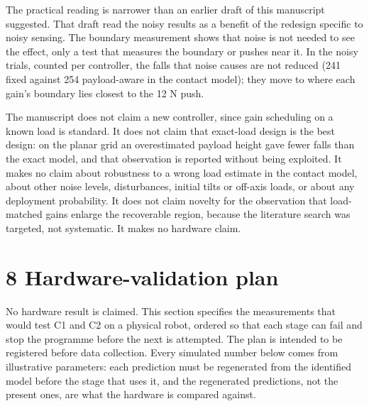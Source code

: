 \documentclass[11pt,a4paper]{article}
\begin{document}
The practical reading is narrower than an earlier draft of this manuscript suggested. That draft read the noisy results as a benefit of the redesign specific to noisy sensing. The boundary measurement shows that noise is not needed to see the effect, only a test that measures the boundary or pushes near it. In the noisy trials, counted per controller, the falls that noise causes are not reduced (241 fixed against 254 payload-aware in the contact model); they move to where each gain's boundary lies closest to the 12 N push.

The manuscript does not claim a new controller, since gain scheduling on a known load is standard. It does not claim that exact-load design is the best design: on the planar grid an overestimated payload height gave fewer falls than the exact model, and that observation is reported without being exploited. It makes no claim about robustness to a wrong load estimate in the contact model, about other noise levels, disturbances, initial tilts or off-axis loads, or about any deployment probability. It does not claim novelty for the observation that load-matched gains enlarge the recoverable region, because the literature search was targeted, not systematic. It makes no hardware claim.

\section*{8 Hardware-validation plan}
No hardware result is claimed. This section specifies the measurements that would test C1 and C2 on a physical robot, ordered so that each stage can fail and stop the programme before the next is attempted. The plan is intended to be registered before data collection. Every simulated number below comes from illustrative parameters: each prediction must be regenerated from the identified model before the stage that uses it, and the regenerated predictions, not the present ones, are what the hardware is compared against.
\end{document}
